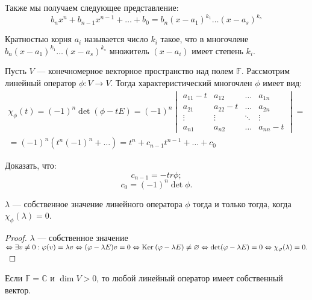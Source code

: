 Также мы получаем следующее представление:
$$
b_nx^n + b_{n-1}x^{n-1} + \ldots + b_0 = b_n(x - a_1)^{k_1}\ldots(x - a_s)^{k_s}
$$

\begin{Def}
	Кратностью корня $a_i$ называется число $k_i$ такое, что в многочлене \\$b_n(x - a_1)^{k_1}\ldots(x - a_s)^{k_s}$ множитель $(x - a_i)$ имеет степень $k_i$.
\end{Def}

\begin{Def}
	Пусть $V$ --- конечномерное векторное пространство над полем $\mathbb{F}$. Рассмотрим линейный оператор $\phi: V \to V$. Тогда характеристический многочлен $\phi$ имеет вид:
	\begin{gather*}
	\chi_{\phi}(t) = (-1)^n\det(\phi - tE) = (-1)^n
  \begin{vmatrix}
  a_{11} - t & a_{12} &\ldots &a_{1n}\\
  a_{21} & a_{22} - t &\ldots &a_{2n} \\
  \vdots &\vdots &\ddots &\vdots\\
  a_{n1} &a_{n2} &\ldots & a_{nn} - t
  \end{vmatrix}
  = \\ 
  = (-1)^n(t^n(-1)^n + \ldots)  = t^n + c_{n-1}t^{n-1} + \ldots + c_0
  \end{gather*}
\end{Def}

\begin{Task}
Доказать, что:
	\[c_{n-1} = -tr\phi;\]
        \[c_0 = (-1)^n \det\phi.\]
\end{Task}

\begin{Statement}
	$\lambda$ --- собственное значение линейного оператора $\phi$ тогда и только тогда, когда $\chi_\phi(\lambda) = 0$. 
\end{Statement}

\begin{proof}
	$\lambda$ --- собственное значение $\Leftrightarrow \exists v \neq 0 : \varphi(v) = \lambda {v} \Leftrightarrow (\varphi - \lambda {E})v = 0 \Leftrightarrow \mathrm{Ker}\:(\varphi - \lambda {E}) \neq \varnothing
	\Leftrightarrow \det(\varphi - \lambda {E}) = 0 \Leftrightarrow \chi_\varphi(\lambda) = 0.$
\end{proof}

\begin{Statement}
	Если $\mathbb{F} = \mathbb{C}$ и $\dim V > 0$, то любой линейный оператор имеет собственный вектор.
\end{Statement}

